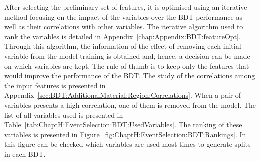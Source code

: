 After selecting the preliminary set of features, it is optimised using an iterative method focusing on the impact of the variables
over the BDT performance as well as their correlations with other variables. The iterative algorithm used to rank the variables 
is detailed in Appendix~\ref{chap:Appendix:BDT:featureOpt}.
Through this algorithm, the information of the effect of removing each initial variable from the model training is obtained and, hence,
a decision can be made on which variables are kept. The rule of thumb is to keep only the features that would improve the
performance of the BDT.
The study of the correlations among the input features is presented in Appendix~\ref{sec:BDT:AdditionalMaterial:Region:Correlations}.
When a pair of variables presents a high correlation, one of them is removed from the model.
The list of all variables used is presented 
in Table~\ref{tab:ChaptH:EventSelection:BDT:UsedVariables}.
The ranking of these variables is presented in Figure~\ref{fig:ChaptH:EventSelection:BDT:Rankings}.
In this figure can be checked which variables are used most times to generate splits in each BDT.




